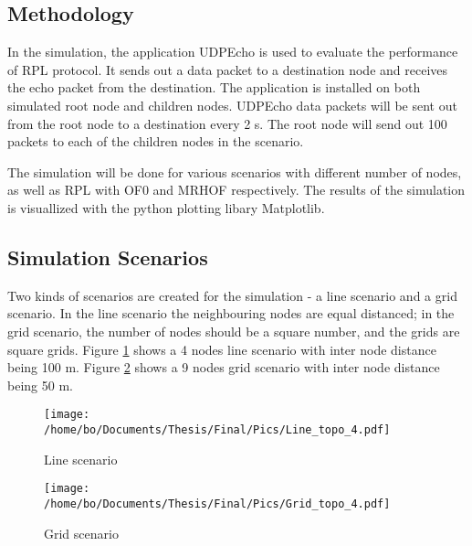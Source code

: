 \subsection{Methodology}
\label{Sim:Method}
In the simulation, the application UDPEcho is used to evaluate the performance of RPL protocol. It sends out a data packet to a destination node and receives the echo packet from the destination. The application is installed on both simulated root node and children nodes. UDPEcho data packets will be sent out from the root node to a destination every 2 s. The root node will send out 100 packets to each of the children nodes in the scenario. 
\newline

The simulation will be done for various scenarios with different number of nodes, as well as RPL with OF0 and MRHOF respectively. The results of the simulation is visuallized with the python plotting libary Matplotlib.

\subsection{Simulation Scenarios}
\label{Sim:Scenarios}
Two kinds of scenarios are created for the simulation - a line scenario and a grid scenario. In the line scenario the neighbouring nodes are equal distanced; in the grid scenario, the number of nodes should be a square number, and the grids are square grids. Figure \ref{fig:scenario_line} shows a 4 nodes line scenario with inter node distance being 100 m. Figure \ref{fig:scenario_grid} shows a 9 nodes grid scenario with inter node distance being 50 m. 

\begin{figure}[htbp]
  \begin{center}
    \leavevmode
      \texttt{[image: /home/bo/Documents/Thesis/Final/Pics/Line\_topo\_4.pdf]}
    \caption{Line scenario}
    \label{fig:scenario_line}
  \end{center}
\end{figure}

\begin{figure}[htbp]
  \begin{center}
    \leavevmode
      \texttt{[image: /home/bo/Documents/Thesis/Final/Pics/Grid\_topo\_4.pdf]}
    \caption{Grid scenario}
    \label{fig:scenario_grid}
  \end{center}
\end{figure}

